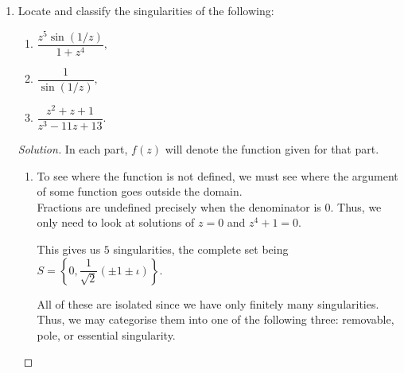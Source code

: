 \documentclass[12pt]{article}
\theoremstyle{definition}
\numberwithin{thm}{section}
\newenvironment{soln}{\begin{proof}[Solution]}{\end{proof}}
\begin{document}
\begin{enumerate}
\begin{soln}
		Use binomial expansion, we see that
		\begin{align*} 
			(z^2 + 1)^{2n} &= \sum_{k=0}^{2n}\dbinom{2n}{k}(z^2)^{k}.
		\end{align*}
		Thus, the desired coefficient is $\dbinom{2n}{n}$ and the integral is
		\begin{equation*} 
			\int_{|z| = 1}^{} \left(z + \dfrac{1}{z}\right)^{2n}\dfrac{1}{z} {\mathrm{d}}z = 2\pi\iota\dbinom{2n}{n}.
		\end{equation*}

		Now, we may compute the integral the menial way, i.e., by \emph{parameterising and solving.}

		Using the standard parameterisation of $z(t) = e^{\iota t}$ for $t \in [0, 2\pi],$ the integral becomes

		\begin{align*} 
			\int_{|z| = 1}^{} \left(z + \dfrac{1}{z}\right)^{2n}\dfrac{1}{z} {\mathrm{d}}z &= \int_{0}^{2\pi} (2\cos t)^{2n}\dfrac{1}{e^{\iota t}}(\iota e^{\iota t}) {\mathrm{d}}t\\
			&= 4^n\iota\int_{0}^{2\pi} \cos^{2n}(t) {\mathrm{d}}t.
		\end{align*}

		Equating it with the previous result gives us the desired answer.
	\end{soln}
	\item Locate and classify the singularities of the following:
	\begin{enumerate}
		\item $\dfrac{z^5\sin(1/z)}{1 + z^4},$
		\item $\dfrac{1}{\sin(1/z)},$
		\item $\dfrac{z^2 + z + 1}{z^3 - 11z + 13}.$
	\end{enumerate}
	\begin{soln}
		In each part, $f(z)$ will denote the function given for that part.
		\begin{enumerate}
			\item To see where the function is not defined, we must see where the argument of some function goes outside the domain.\\
			Fractions are undefined precisely when the denominator is $0.$ Thus, we only need to look at solutions of $z = 0$ and $z^4 + 1 = 0.$

			This gives us $5$ singularities, the complete set being $S = \left\{0, \dfrac{1}{\sqrt{2}}(\pm1\pm\iota)\right\}.$

			All of these are isolated since we have only finitely many singularities. Thus, we may categorise them into one of the following three: removable, pole, or essential singularity.


\end{enumerate}
\end{soln}
\end{enumerate}
\end{document}
